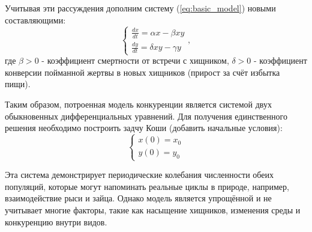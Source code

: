 Учитывая эти рассуждения дополним систему (\ref{eq:basic_model}) новыми составляющими:
\begin{equation}
	\begin{cases}
		\frac{dx}{dt} = \alpha x - \beta x y\\
		\frac{dy}{dt} = \delta x y  - \gamma y
	\end{cases},
	\label{eq:model}
\end{equation}
где $\beta > 0$ - коэффициент смертности от встречи с хищником, $\delta > 0$ - коэффициент конверсии пойманной жертвы в новых хищников (прирост за счёт избытка пищи).

Таким образом, потроенная модель конкуренции является системой двух обыкновенных дифференциальных уравнений.
Для получения единственного решения необходимо построить задчу Коши (добавить начальные условия):
\begin{equation}
	\begin{cases}
		x(0) = x_0\\
		y(0) = y_0
	\end{cases}
	\label{eq:terms}
\end{equation}

Эта система демонстрирует периодические колебания численности обеих популяций, которые могут напоминать реальные циклы в природе, например, взаимодействие рыси и зайца. Однако модель является упрощённой и не учитывает многие факторы, такие как насыщение хищников, изменения среды и конкуренцию внутри видов.


 
 
 
